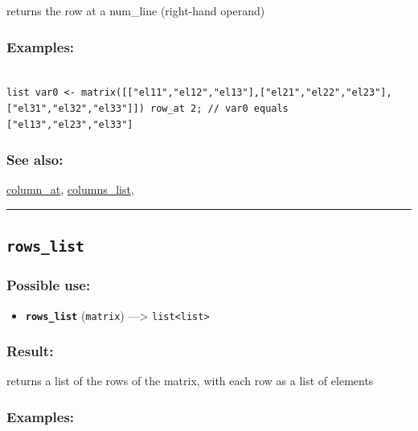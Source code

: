 \documentclass[]{book}
\providecommand{\tightlist}{%
  \setlength{\itemsep}{0pt}\setlength{\parskip}{0pt}}
\theoremstyle{definition}
\theoremstyle{definition}
\theoremstyle{definition}
\theoremstyle{remark}
\begin{document}
returns the row at a num\_line (right-hand operand)

\subsubsection{Examples:}\label{examples-307}

\begin{verbatim}
 
list var0 <- matrix([["el11","el12","el13"],["el21","el22","el23"],["el31","el32","el33"]]) row_at 2; // var0 equals ["el13","el23","el33"]
\end{verbatim}

\subsubsection{See also:}\label{see-also-181}

\href{operators-b-to-c.html\#column_at}{column\_at},
\href{operators-b-to-c.html\#columns_list}{columns\_list},

\begin{center}\rule{0.5\linewidth}{\linethickness}\end{center}

\subsection{\texorpdfstring{\texttt{rows\_list}}{rows\_list}}\label{rows_list}

\subsubsection{Possible use:}\label{possible-use-447}

\begin{itemize}
\tightlist
\item
  \textbf{\texttt{rows\_list}} (\texttt{matrix}) ---\textgreater{}
  \texttt{list\textless{}list\textgreater{}}
\end{itemize}

\subsubsection{Result:}\label{result-433}

returns a list of the rows of the matrix, with each row as a list of
elements

\subsubsection{Examples:}\label{examples-308}
\end{document}
